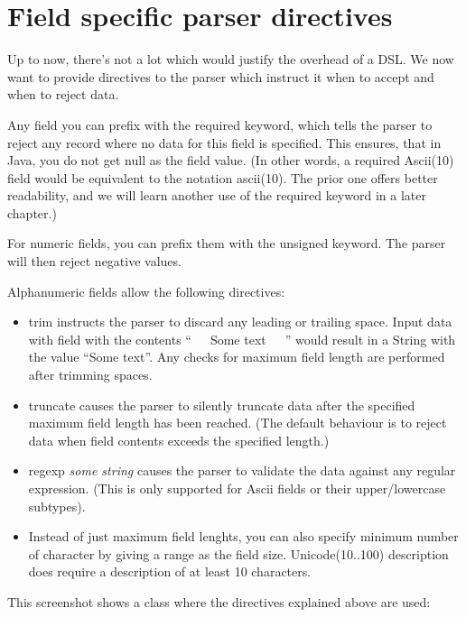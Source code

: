 \documentclass[11pt,a4paper,oneside]{article}
\begin{document}
\section{Field specific parser directives}
Up to now, there's not a lot which would justify the overhead of a DSL.  
We now want to provide directives to the parser which instruct it when to accept and when to reject data. 

Any field you can prefix with the {\ttfamily required} keyword, which tells the parser to reject any record where no data for this field is specified.
This ensures, that in Java, you do not get {\ttfamily null} as the field value. (In other words, a {\ttfamily required
Ascii(10)} field would be equivalent to the notation {\ttfamily ascii(10)}.
The prior one offers better readability, and we will learn another use of the {\ttfamily required} keyword in a later chapter.)

For numeric fields, you can prefix them with the {\ttfamily unsigned} keyword. The parser will then reject negative values.

Alphanumeric fields allow the following directives:
\begin{itemize}
  \item {\ttfamily trim} instructs the parser to discard any leading or trailing space. Input data with field with the contents ``\ \ \ Some text\ \ \  '' would result in a String with the
  value ``Some text''. Any checks for maximum field length are performed after trimming spaces.
  \item {\ttfamily truncate} causes the parser to silently truncate data after the specified maximum field length has been reached.
   (The default behaviour is to reject data when field contents exceeds the specified length.) 
   \item {\ttfamily regexp} {\it{some string}} causes the parser to validate the data against any regular expression. (This is only supported for
     {\ttfamily Ascii} fields or their upper/lowercase subtypes).
   \item Instead of just maximum field lenghts, you can also specify minimum number of character by giving a range as the field size.
    {\ttfamily Unicode(10..100) description} does require a description of at least 10 characters. 
\end{itemize}

This screenshot shows a class where the directives explained above are used:

\vspace{2mm}
\end{document}
